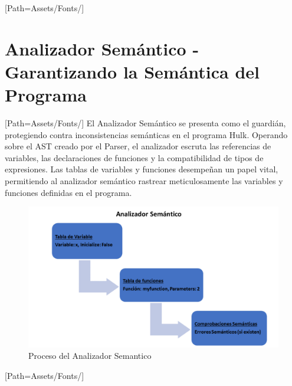\documentclass{article}
\begin{document}
\setmainfont{LEMONMILK-Bold.otf}[Path=Assets/Fonts/]
\section{Analizador Semántico - Garantizando la Semántica del Programa}
    \setmainfont{LEMONMILK-Regular.otf}[Path=Assets/Fonts/]
    El Analizador Semántico se presenta como el guardián, protegiendo contra inconsistencias semánticas en el programa Hulk. Operando sobre el AST creado por el Parser, el analizador escruta las referencias de variables, las declaraciones de funciones y la compatibilidad de tipos de expresiones. Las tablas de variables y funciones desempeñan un papel vital, permitiendo al analizador semántico rastrear meticulosamente las variables y funciones definidas en el programa.
    \begin{figure}[ht]
        \centering
        \includegraphics[width=0.5\linewidth]{Assets/AnalizadorSemantico.png} %
        \caption{Proceso del Analizador Semantico}
        \label{fig:Asemantico}
    \end{figure}
\newpage

\setmainfont{LEMONMILK-Bold.otf}[Path=Assets/Fonts/]
\end{document}

